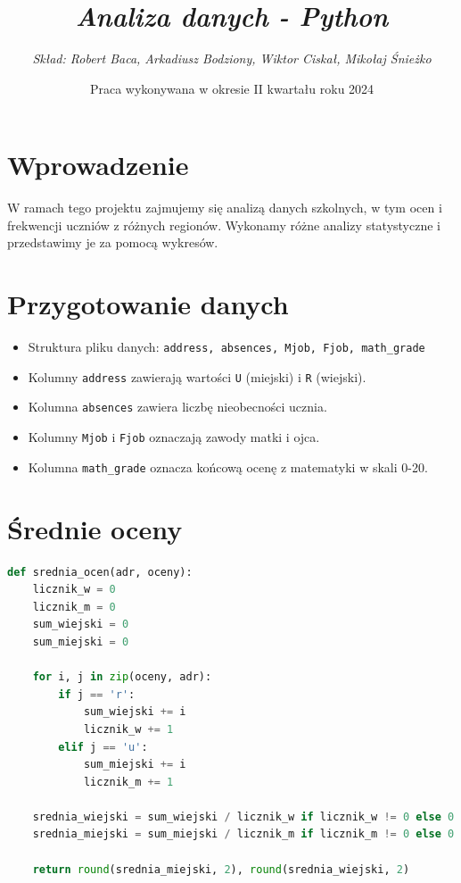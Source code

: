 \documentclass{article}
\begin{document}
\title{\textbf{\textit{Analiza danych - Python}}}
\author{\textit{Skład: Robert Baca, Arkadiusz Bodziony, Wiktor Ciskał, Mikołaj Śnieżko}}
\date{Praca wykonywana w okresie II kwartału roku 2024}
\maketitle

\vspace{1cm}
\section{Wprowadzenie}
W ramach tego projektu zajmujemy się analizą danych szkolnych, w tym ocen i frekwencji uczniów z różnych regionów. Wykonamy różne analizy statystyczne i przedstawimy je za pomocą wykresów.

\section{Przygotowanie danych}
\begin{itemize}
    \item Struktura pliku danych: \texttt{address, absences, Mjob, Fjob, math\_grade}
    \item Kolumny \texttt{address} zawierają wartości \texttt{U} (miejski) i \texttt{R} (wiejski).
    \item Kolumna \texttt{absences} zawiera liczbę nieobecności ucznia.
    \item Kolumny \texttt{Mjob} i \texttt{Fjob} oznaczają zawody matki i ojca.
    \item Kolumna \texttt{math\_grade} oznacza końcową ocenę z matematyki w skali 0-20.
\end{itemize}

\section{Średnie oceny}
\begin{lstlisting}[language=Python]
def srednia_ocen(adr, oceny):
    licznik_w = 0
    licznik_m = 0
    sum_wiejski = 0
    sum_miejski = 0

    for i, j in zip(oceny, adr):
        if j == 'r':
            sum_wiejski += i
            licznik_w += 1
        elif j == 'u':
            sum_miejski += i
            licznik_m += 1

    srednia_wiejski = sum_wiejski / licznik_w if licznik_w != 0 else 0
    srednia_miejski = sum_miejski / licznik_m if licznik_m != 0 else 0

    return round(srednia_miejski, 2), round(srednia_wiejski, 2)
\end{lstlisting}
\end{document}

